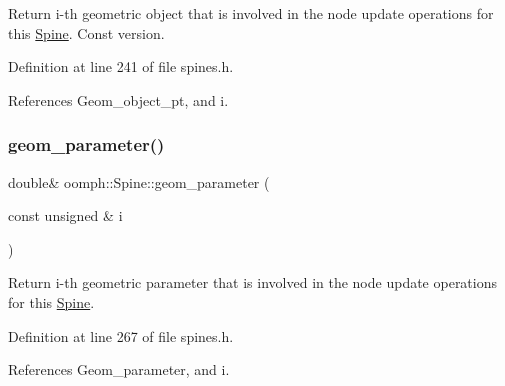 Return i-\/th geometric object that is involved in the node update operations for this \hyperlink{classoomph_1_1Spine}{Spine}. Const version. 



Definition at line 241 of file spines.\+h.



References Geom\+\_\+object\+\_\+pt, and i.

\mbox{\label{classoomph_1_1Spine_a8d8bd170521e615dda38a0d3fdef09cb}} 
\subsubsection{\texorpdfstring{geom\+\_\+parameter()}{geom\_parameter()}\hspace{0.1cm}{\footnotesize\ttfamily [1/2]}}
{\footnotesize\ttfamily double\& oomph\+::\+Spine\+::geom\+\_\+parameter (\begin{DoxyParamCaption}\item[{const unsigned \&}]{i }\end{DoxyParamCaption})\hspace{0.3cm}{\ttfamily [inline]}}



Return i-\/th geometric parameter that is involved in the node update operations for this \hyperlink{classoomph_1_1Spine}{Spine}. 



Definition at line 267 of file spines.\+h.



References Geom\+\_\+parameter, and i.



